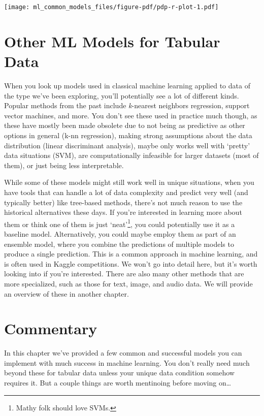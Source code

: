 \documentclass[
  letterpaper,
]{krantz}
\begin{document}
\texttt{[image: ml\_common\_models\_files/figure-pdf/pdp-r-plot-1.pdf]}

\section{Other ML Models for Tabular
Data}\label{other-ml-models-for-tabular-data}

When you look up models used in classical machine learning applied to
data of the type we've been exploring, you'll potentially see a lot of
different kinds. Popular methods from the past include \emph{k}-nearest
neighbors regression, support vector machines, and more. You don't see
these used in practice much though, as these have mostly been made
obsolete due to not being as predictive as other options in general
(k-nn regression), making strong assumptions about the data distribution
(linear discriminant analysis), maybe only works well with `pretty' data
situations (SVM), are computationally infeasible for larger datasets
(most of them), or just being less interpretable.

While some of these models might still work well in unique situations,
when you have tools that can handle a lot of data complexity and predict
very well (and typically better) like tree-based methods, there's not
much reason to use the historical alternatives these days. If you're
interested in learning more about them or think one of them is just
`neat'\footnote{Mathy folk should love SVMs.}, you could potentially use
it as a baseline model. Alternatively, you could maybe employ them as
part of an ensemble model, where you combine the predictions of multiple
models to produce a single prediction. This is a common approach in
machine learning, and is often used in Kaggle competitions. We won't go
into detail here, but it's worth looking into if you're interested.
There are also many other methods that are more specialized, such as
those for text, image, and audio data. We will provide an overview of
these in another chapter.

\section{Commentary}\label{commentary-4}

In this chapter we've provided a few common and successful models you
can implement with much success in machine learning. You don't really
need much beyond these for tabular data unless your unique data
condition somehow requires it. But a couple things are worth mentinoing
before moving on\ldots{}
\end{document}
